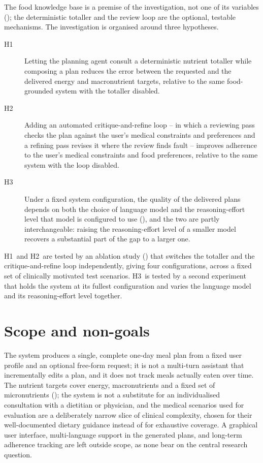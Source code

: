 The food knowledge base is a premise of the investigation, not one of its variables (); the deterministic totaller and the review loop are the optional, testable mechanisms. The investigation is organised around three hypotheses.

\begin{description}
    \item[H1] Letting the planning agent consult a deterministic nutrient totaller while composing a plan reduces the error between the requested and the delivered energy and macronutrient targets, relative to the same food-grounded system with the totaller disabled.
    \item[H2] Adding an automated critique-and-refine loop -- in which a reviewing pass checks the plan against the user's medical constraints and preferences and a refining pass revises it where the review finds fault -- improves adherence to the user's medical constraints and food preferences, relative to the same system with the loop disabled.
    \item[H3] Under a fixed system configuration, the quality of the delivered plans depends on both the choice of language model and the reasoning-effort level that model is configured to use (), and the two are partly interchangeable: raising the reasoning-effort level of a smaller model recovers a substantial part of the gap to a larger one.
\end{description}

H1~and H2~are tested by an ablation study () that switches the totaller and the critique-and-refine loop independently, giving four configurations, across a fixed set of clinically motivated test scenarios. H3~is tested by a second experiment that holds the system at its fullest configuration and varies the language model and its reasoning-effort level together.

\section{Scope and non-goals}
\label{sec:introduction-scope}

The system produces a single, complete one-day meal plan from a fixed user profile and an optional free-form request; it is not a multi-turn assistant that incrementally edits a plan, and it does not track meals actually eaten over time. The nutrient targets cover energy, macronutrients and a fixed set of micronutrients (); the system is not a substitute for an individualised consultation with a dietitian or physician, and the medical scenarios used for evaluation are a deliberately narrow slice of clinical complexity, chosen for their well-documented dietary guidance instead of for exhaustive coverage. A graphical user interface, multi-language support in the generated plans, and long-term adherence tracking are left outside scope, as none bear on the central research question.

